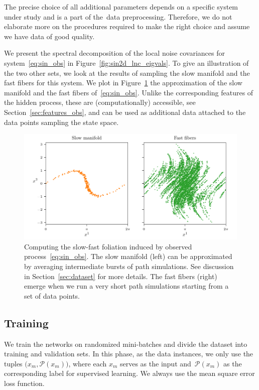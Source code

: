 \documentclass{article}
\newcommand{\proj}{\mathcal{P}} %
\begin{document}
The precise choice of all additional parameters depends on a specific system under study and is a part of the~data preprocessing. Therefore, we do not elaborate more on the procedures required to make the right choice and assume we have data of good quality.

We present the spectral decomposition of the local noise covariances for system~\eqref{eq:sin_obs} in Figure~\ref{fig:sin2d_lnc_eigvals}. To give an illustration of the two other sets, we look at the results of sampling the slow manifold and the fast fibers for this system. We plot in Figure~\ref{fig:sin2d_fibs_sman} the approximation of the slow manifold and the fast fibers of~\eqref{eq:sin_obs}. Unlike the corresponding features of the hidden process, these are (computationally) accessible, see Section~\ref{sec:features_obs}, and can be used as additional data attached to the data points sampling the state space.
\begin{figure}
    \centering
    \includegraphics[draft=false,width=\textwidth]{figs/sin2d_fibs_sman.pdf}
    \caption{Computing the slow-fast foliation induced by observed process~\eqref{eq:sin_obs}. The slow manifold (left) can be approximated by averaging intermediate bursts of path simulations. See discussion in Section~\ref{sec:dataset} for more details. The fast fibers (right) emerge when we run a very short path simulations starting from a set of data points.}
    \label{fig:sin2d_fibs_sman}
\end{figure}

\subsection{Training}
We train the networks on randomized mini-batches and divide the dataset into training and validation sets. In this phase, as the data instances, we only use the tuples $\big(x_m,\proj(x_m)\big)$, where each $x_m$ serves as the input and~$\proj(x_m)$ as the corresponding label for supervised learning. We always use the mean square error loss function.
\end{document}
